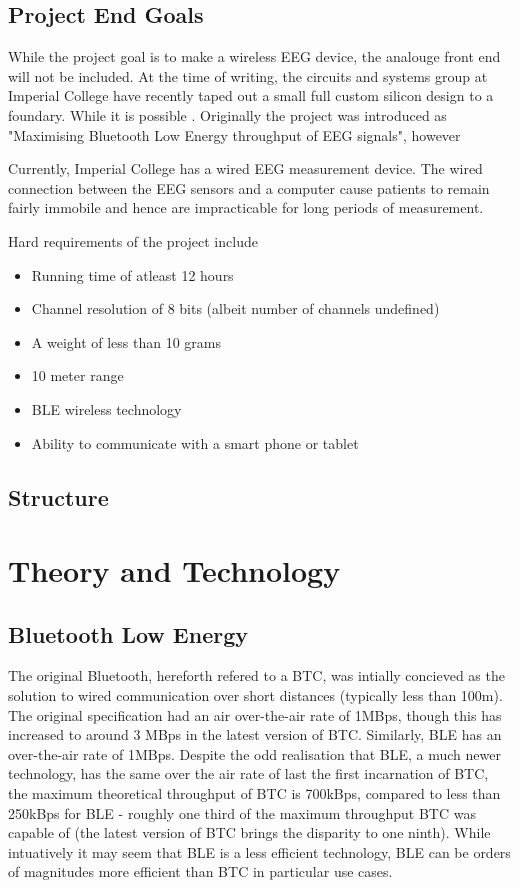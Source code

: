 \documentclass[]{article}
\begin{document}
\subsection{Project End Goals}
While the project goal is to make a wireless EEG device, the analouge front end will not be included. At the time of writing, the circuits and systems group at Imperial College have recently taped out a small full custom silicon design to a foundary. While it is possible . Originally the project was introduced as "Maximising Bluetooth Low Energy throughput of \ac{EEG} signals", however 

Currently, Imperial College has a wired EEG measurement device. The wired connection between the EEG sensors and a computer cause patients to remain fairly immobile and hence are impracticable for long periods of measurement. 

Hard requirements of the project include 
\begin{itemize}
	\item Running time of atleast 12 hours
	\item Channel resolution of 8 bits (albeit number of channels undefined)
	\item A weight of less than 10 grams
	\item 10 meter range
	\item BLE wireless technology
	\item Ability to communicate with a smart phone or tablet
\end{itemize}

\subsection {Structure}

\clearpage
\section{Theory and Technology}
\subsection{Bluetooth Low Energy}
The original Bluetooth, hereforth refered to a \ac{BTC}, was intially concieved as the solution to wired communication over short distances (typically less than 100m). The original specification had an air over-the-air rate of 1MBps, though this has increased to around 3 MBps in the latest version of \ac{BTC}. Similarly, BLE has an over-the-air rate of 1MBps. Despite the odd realisation that \ac{BLE}, a much newer technology, has the same over the air rate of last the first incarnation of \ac{BTC}, the maximum theoretical throughput of \ac{BTC} is 700kBps, compared to less than 250kBps for \ac{BLE} - roughly one third of the maximum throughput \ac{BTC} was capable of (the latest version of \ac{BTC} brings the disparity to one ninth). While intuatively it may seem that \ac{BLE} is a less efficient technology, \ac{BLE} can be orders of magnitudes more efficient than \ac{BTC} in particular use cases.
\end{document}
